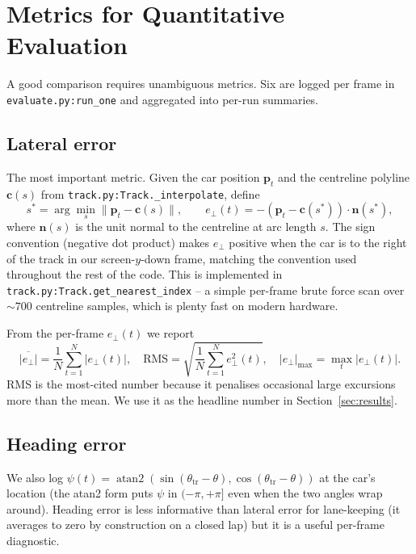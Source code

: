 \section{Metrics for Quantitative Evaluation}
\label{sec:metrics}

A good comparison requires unambiguous metrics. Six are logged per
frame in \texttt{evaluate.py:run\_one} and aggregated into per-run
summaries.

\subsection{Lateral error}

The most important metric. Given the car position $\mathbf p_t$ and
the centreline polyline $\mathbf c(s)$ from
\texttt{track.py:Track.\_interpolate}, define
\[
s^* = \arg\min_s \|\mathbf p_t - \mathbf c(s)\|,\qquad
e_\perp(t) = -(\mathbf p_t - \mathbf c(s^*))\cdot\mathbf n(s^*),
\]
where $\mathbf n(s)$ is the unit normal to the centreline at arc
length $s$. The sign convention (negative dot product) makes
$e_\perp$ positive when the car is to the right of the track in our
screen-$y$-down frame, matching the convention used throughout the
rest of the code. This is implemented in
\texttt{track.py:Track.get\_nearest\_index} -- a simple per-frame
brute force scan over $\sim 700$ centreline samples, which is plenty
fast on modern hardware.

From the per-frame $e_\perp(t)$ we report
\[
\overline{|e_\perp|} = \frac{1}{N}\sum_{t=1}^{N}|e_\perp(t)|,\quad
\text{RMS} = \sqrt{\frac{1}{N}\sum_{t=1}^{N}e_\perp^2(t)},\quad
|e_\perp|_{\max} = \max_t |e_\perp(t)|.
\]
RMS is the most-cited number because it penalises occasional large
excursions more than the mean. We use it as the headline number in
Section~\ref{sec:results}.

\subsection{Heading error}

We also log
$\psi(t) = \operatorname{atan2}(\sin(\theta_{\text{tr}}-\theta),\cos(\theta_{\text{tr}}-\theta))$
at the car's location (the atan2 form puts $\psi$ in $(-\pi,+\pi]$
even when the two angles wrap around). Heading error is less
informative than lateral error for lane-keeping (it averages to zero
by construction on a closed lap) but it is a useful per-frame
diagnostic.

